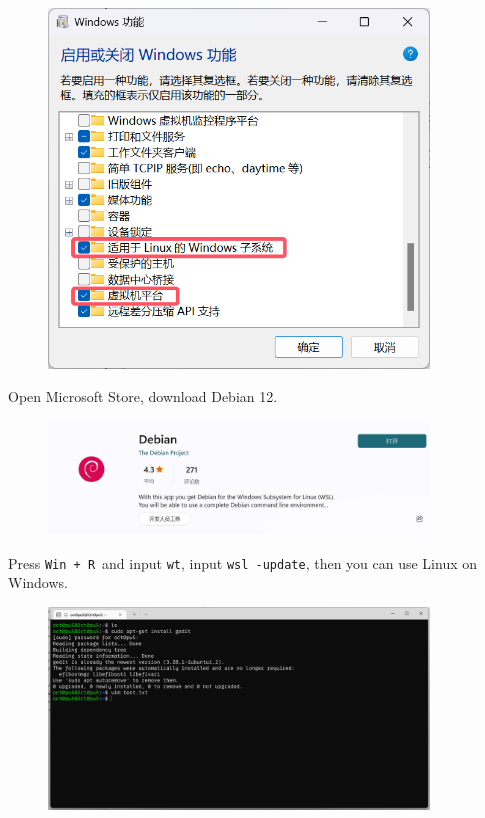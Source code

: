 \documentclass[12pt]{ctexart}
\begin{document}
\begin{figure}[H]
    \centering
    \includegraphics[width=0.9\textwidth,keepaspectratio]{assets/Linux/1.1 How to install Debian on Windows/2.png}
\end{figure}

Open Microsoft Store, download Debian 12.

\begin{figure}[H]
    \centering
    \includegraphics[width=0.9\textwidth,keepaspectratio]{assets/Linux/1.1 How to install Debian on Windows/3.png}
\end{figure}
Press \texttt{Win\ +\ R}\ and input \texttt{wt}, input
\texttt{wsl -update}, then you can use Linux on Windows.

\begin{figure}[H]
    \centering
    \includegraphics[width=0.9\textwidth,keepaspectratio]{assets/Linux/1.1 How to install Debian on Windows/4.png}
\end{figure}
\end{document}
